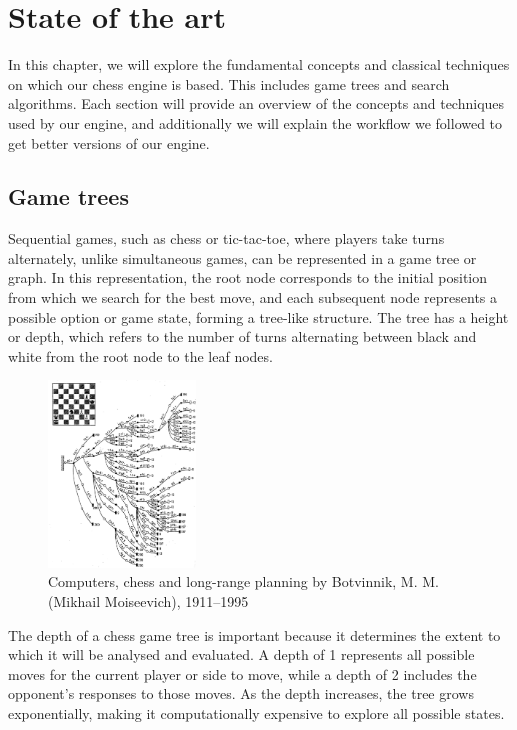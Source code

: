 \chapter{State of the art}
\label{cap:estadoDeLaCuestion}

In this chapter, we will explore the fundamental concepts and classical techniques on which our chess engine is based. This includes game trees and search algorithms. Each section will provide an overview of the concepts and techniques used by our engine, and additionally we will explain the workflow we followed to get better versions of our engine.

\section{Game trees}

Sequential games, such as chess or tic-tac-toe, where players take turns alternately, unlike simultaneous games, can be represented in a game tree or graph. In this representation, the root node corresponds to the initial position from which we search for the best move, and each subsequent node represents a possible option or game state, forming a tree-like structure. The tree has a height or depth, which refers to the number of turns alternating between black and white from the root node to the leaf nodes.

\begin{figure}[H]
    \centering
    \includegraphics[width=0.35\textwidth]{Imagenes/chess-game-tree.jpg}
    \caption{Computers, chess and long-range planning by Botvinnik, M. M. (Mikhail Moiseevich), 1911--1995}
    \label{fig:game-tree}
\end{figure}

\noindent The depth of a chess game tree is important because it determines the extent to which it will be analysed and evaluated. A depth of 1 represents all possible moves for the current player or side to move, while a depth of 2 includes the opponent's responses to those moves. As the depth increases, the tree grows exponentially, making it computationally expensive to explore all possible states.

